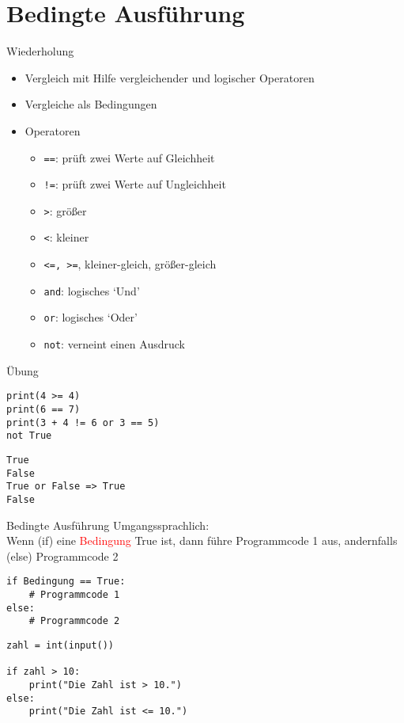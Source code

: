 \section{Bedingte Ausführung}

\begin{frame}[fragile]{Wiederholung}
	\begin{itemize}
		\item Vergleich mit Hilfe vergleichender und logischer Operatoren
		\item Vergleiche als Bedingungen
		\item Operatoren
	\begin{itemize}
		\item \texttt{==}: prüft zwei Werte auf Gleichheit
		\item \texttt{!=}: prüft zwei Werte auf Ungleichheit
		\item \texttt{>}: größer
		\item \texttt{<}: kleiner 
		\item \texttt{<=, >=}, kleiner-gleich, größer-gleich
		\item \texttt{and}: logisches `Und'
		\item \texttt{or}: logisches `Oder'
		\item \texttt{not}: verneint einen Ausdruck
	\end{itemize}
	\end{itemize}
\end{frame}
\begin{frame}[fragile]{Übung}
\begin{lstlisting} 
print(4 >= 4) 
print(6 == 7)
print(3 + 4 != 6 or 3 == 5)
not True

\end{lstlisting}
\pause{}
\begin{lstlisting} 
True
False
True or False => True
False
\end{lstlisting}
\end{frame}

\begin{frame}[fragile]{Bedingte Ausführung}
Umgangssprachlich:\\ Wenn (if) eine \textcolor{red}{Bedingung} True ist, dann führe Programmcode 1 aus, andernfalls (else) Programmcode 2\\

\begin{lstlisting}
if Bedingung == True:
	# Programmcode 1 
else:
	# Programmcode 2 
\end{lstlisting}

\begin{lstlisting}
zahl = int(input())

if zahl > 10:
	print("Die Zahl ist > 10.")
else:
	print("Die Zahl ist <= 10.")
\end{lstlisting}
\end{frame}

